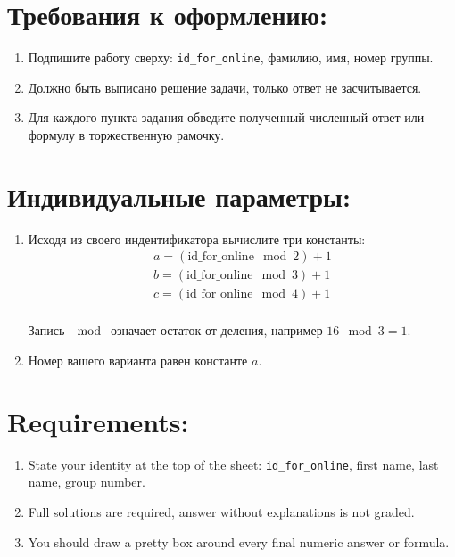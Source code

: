 \documentclass[12pt]{article}
\def \id {\mathrm{id}\_\mathrm{for}\_\mathrm{online}}
\begin{document}
\section*{Требования к оформлению:}

\begin{enumerate}
\item Подпишите работу сверху: \verb|id_for_online|, фамилию, имя, номер группы.
\item Должно быть выписано решение задачи, только ответ не засчитывается.
\item Для каждого пункта задания обведите полученный численный ответ или формулу в торжественную рамочку.
\end{enumerate}

\section*{Индивидуальные параметры:}

\begin{enumerate}
\item Исходя из своего индентификатора вычислите три константы: 
\begin{align*}
a = (\id \mod 2) + 1 \\
b = (\id \mod 3) + 1 \\
c = (\id \mod 4) + 1 \\
\end{align*}

Запись $\mod$ означает остаток от деления, например $16 \mod 3 = 1$. 

\item Номер вашего варианта равен константе $a$.
\end{enumerate}



\section*{Requirements:}

\begin{enumerate}
\item State your identity at the top of the sheet: \verb|id_for_online|, first name, last name, group number.
\item Full solutions are required, answer without explanations is not graded. 
\item You should draw a pretty box around every final numeric answer or formula.
\end{enumerate}
\end{document}
